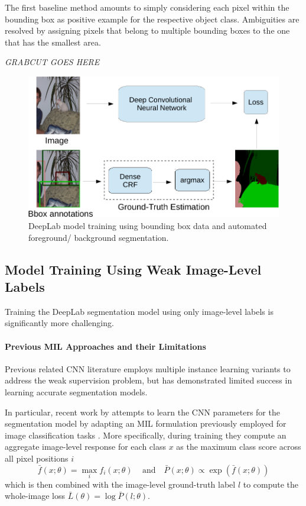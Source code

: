 The first baseline method amounts to simply considering each pixel
within the bounding box as positive example for the respective object
class. Ambiguities are resolved by assigning pixels that belong to
multiple bounding boxes to the one that has the smallest area.

\emph{GRABCUT GOES HERE}

\begin{figure}[htbp!]
  \centering
  \includegraphics[width=0.9\linewidth]{fig/model_train_bbox.pdf} 
  \caption{DeepLab model training using bounding box data and
    automated foreground/ background segmentation.}
  \label{fig:model_train_bbox}
\end{figure}


\subsection{Model Training Using Weak Image-Level Labels}

Training the DeepLab segmentation model using only image-level labels
is significantly more challenging.

\paragraph{Previous MIL Approaches and their Limitations}

Previous related CNN literature employs multiple instance learning
variants to address the weak supervision problem, but has demonstrated
limited success in learning accurate segmentation models. 

In particular, recent work by \citet{pathak2014fully} attempts to
learn the CNN parameters for the segmentation model by adapting an MIL
formulation previously employed for image classification tasks
\citep{oquab2014weakly, papandreou2014untangling}. More specifically,
during training they compute an aggregate image-level response for
each class $x$ as the maximum class score across all pixel positions
$i$
\begin{equation}
  \label{eq:mil}
  \bar{f}(x; \theta) = \max_i f_i(x; \theta) \,
  \quad \mathrm{and} \quad
  \bar{P}(x; \theta) \propto \exp \left( \bar{f}(x; \theta) \right)
\end{equation}
which is then combined with the image-level ground-truth label $l$ to
compute the whole-image loss $\bar{L}(\theta) = \log \bar{P}(l;
\theta)$.

